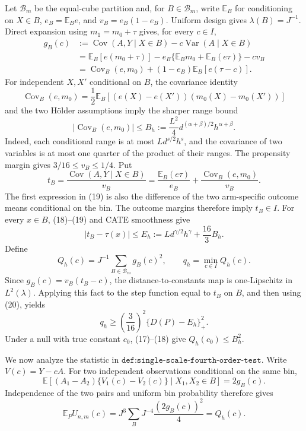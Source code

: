 Let \(\mathcal B_m\) be the equal-cube partition and, for \(B\in\mathcal B_m\), write \(\mathbb E_B\) for conditioning on \(X\in B\), \(e_B=\mathbb E_Be\), and \(v_B=e_B(1-e_B)\). Uniform design gives \(\lambda(B)=J^{-1}\). Direct expansion using \(m_1=m_0+\tau\) gives, for every \(c\in I\),
\[
 \begin{aligned}
 g_B(c)
 &:=\operatorname{Cov}(A,Y\mid X\in B)-c\operatorname{Var}(A\mid X\in B)\\
 &=\mathbb E_B[e(m_0+\tau)]-e_B\{\mathbb E_Bm_0+\mathbb E_B(e\tau)\}-cv_B\\
 &=\operatorname{Cov}_B(e,m_0)+(1-e_B)\mathbb E_B[e(\tau-c)].
 \end{aligned}                                                       \tag{17}
\]
For independent \(X,X'\) conditional on \(B\), the covariance identity
\[
 \operatorname{Cov}_B(e,m_0)
 =\frac12\mathbb E_B[(e(X)-e(X'))(m_0(X)-m_0(X'))]
\]
and the two Hölder assumptions imply the sharper range bound
\[
 |\operatorname{Cov}_B(e,m_0)|
 \le B_h:=\frac{L^2}{4}d^{(\alpha+\beta)/2}h^{\alpha+\beta}.          \tag{18}
\]
Indeed, each conditional range is at most \(Ld^{s/2}h^s\), and the covariance of two variables is at most one quarter of the product of their ranges. The propensity margin gives \(3/16\le v_B\le1/4\). Put
\[
 t_B=\frac{\operatorname{Cov}(A,Y\mid X\in B)}{v_B}
     =\frac{\mathbb E_B(e\tau)}{e_B}
      +\frac{\operatorname{Cov}_B(e,m_0)}{v_B}.                       \tag{19}
\]
The first expression in (19) is also the difference of the two arm-specific outcome means conditional on the bin. The outcome margins therefore imply \(t_B\in I\). For every \(x\in B\), (18)--(19) and CATE smoothness give
\[
 |t_B-\tau(x)|\le E_h
 :=Ld^{\gamma/2}h^\gamma+\frac{16}{3}B_h.                            \tag{20}
\]
Define
\[
 Q_h(c)=J^{-1}\sum_{B\in\mathcal B_m}g_B(c)^2,
 \qquad q_h=\min_{c\in I}Q_h(c).
\]
Since \(g_B(c)=v_B(t_B-c)\), the distance-to-constants map is one-Lipschitz in \(L^2(\lambda)\). Applying this fact to the step function equal to \(t_B\) on \(B\), and then using (20), yields
\[
 q_h\ge\left(\frac3{16}\right)^2\{D(P)-E_h\}_+^2.                    \tag{21}
\]
Under a null with true constant \(c_0\), (17)--(18) give \(Q_h(c_0)\le B_h^2\).

We now analyze the statistic in \(\texttt{def:single-scale-fourth-order-test}\). Write \(V(c)=Y-cA\). For two independent observations conditional on the same bin,
\[
 \mathbb E[(A_1-A_2)\{V_1(c)-V_2(c)\}\mid X_1,X_2\in B]=2g_B(c).
\]
Independence of the two pairs and uniform bin probability therefore gives
\[
 \mathbb E_PU_{n,m}(c)
 =J^3\sum_BJ^{-4}\frac{(2g_B(c))^2}{4}=Q_h(c).                       \tag{22}
\]

